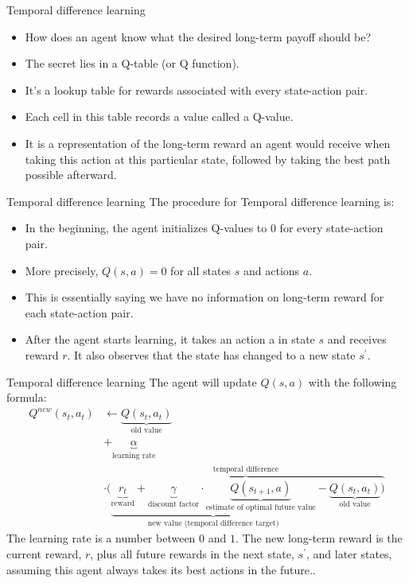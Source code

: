 \documentclass[11pt]{beamer}
\begin{document}
\begin{frame}{Temporal difference learning}
\begin{itemize}
\item How does an agent know what the desired long-term payoff should be? 
\item The secret lies in a Q-table (or Q function). 
\item It’s a lookup table for rewards associated with every state-action pair. 
\item Each cell in this table records a value called a Q-value. \item It is a representation of the long-term reward an agent would receive when taking this action at this particular state, followed by taking the best path possible afterward.
\end{itemize}
\end{frame}
\begin{frame}{Temporal difference learning}
The procedure for Temporal difference learning is:
\begin{itemize}
\item In the beginning, the agent initializes Q-values to $0$ for every state-action pair. 
\item More precisely, $Q(s,a) = 0$ for all states $s$ and actions $a$. 
\item This is essentially saying we have no information on long-term reward for each state-action pair.
\item After the agent starts learning, it takes an action a in state $s$ and receives reward $r$. It also observes that the state has changed to a new state $s^\prime$. 
\end{itemize}
\end{frame}
\begin{frame}{Temporal difference learning}
The agent will update $Q(s,a)$ with the following formula:
\begin{align*}
Q^{new}(s_{t},a_{t}) & \leftarrow 
\underbrace {Q(s_{t},a_{t})}_{\text{old value}} \\
& +\underbrace {\alpha }_{\text{learning rate}} \\ 
&\cdot  
\overbrace{{
\bigg(}
\underbrace {\underbrace {r_{t}} _{\text{reward}} +
\underbrace {\gamma } _{\text{discount factor}}   \cdot
\underbrace {Q(s_{t+1},a)}_{\text{estimate of optimal future value}}}_{\text{new value (temporal difference target)}} 
-\underbrace {Q(s_{t},a_{t})}_{\text{old value}}
{\bigg )}}^{\text{temporal difference}}
\end{align*}
\scriptsize
The learning rate is a number between $0$ and $1$. The new long-term reward is the current reward, $r$, plus all future rewards in the next state, $s^\prime$, and later states, assuming this agent always takes its best actions in the future..
\end{frame}
\end{document}
